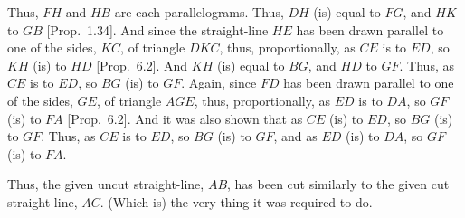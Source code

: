 \begin{Parallel}{}{}
{\epsfysize=2.2in
\centerline{}

Thus, $FH$ and $HB$ are each parallelograms. Thus, $DH$ (is) equal to $FG$,
and $HK$ to $GB$ [Prop.~1.34]. 
And since the straight-line $HE$ has been drawn parallel to one of the
sides, $KC$, of triangle $DKC$, thus, proportionally, as $CE$ is to $ED$,  so $KH$
(is) to $HD$ [Prop.~6.2]. And $KH$ (is)
equal to $BG$, and $HD$ to $GF$. Thus, as $CE$ is to $ED$, so $BG$ (is) to $GF$. 
Again, since $FD$ has been drawn parallel to one of the sides, $GE$, of
triangle $AGE$, thus, proportionally, as $ED$ is to $DA$, so $GF$ (is) to $FA$
[Prop.~6.2]. And it was also shown
that as $CE$ (is) to $ED$, so $BG$ (is) to $GF$. Thus, as
$CE$ is to $ED$, so $BG$ (is) to $GF$, and as $ED$ (is) to $DA$, so $GF$ (is) to
$FA$.

Thus, the given uncut straight-line, $AB$, has been cut similarly
to the given cut straight-line, $AC$. (Which is) the very thing it was required to do.}
\end{Parallel}

